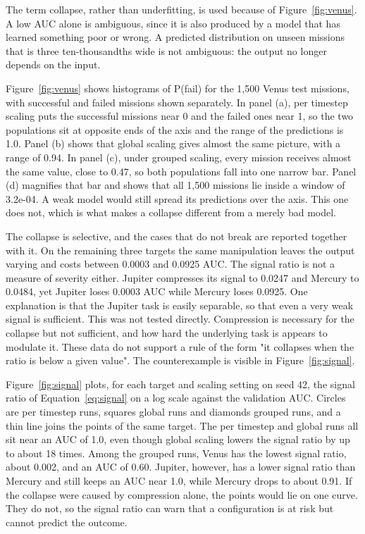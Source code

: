 The term collapse, rather than underfitting, is used because of Figure~\ref{fig:venus}. A low AUC alone is ambiguous, since it is also produced by a model that has learned something poor or wrong. A predicted distribution on unseen missions that is three ten-thousandths wide is not ambiguous: the output no longer depends on the input.


Figure~\ref{fig:venus} shows histograms of P(fail) for the 1,500 Venus test missions, with successful and failed missions shown separately. In panel (a), per timestep scaling puts the successful missions near 0 and the failed ones near 1, so the two populations sit at opposite ends of the axis and the range of the predictions is 1.0. Panel (b) shows that global scaling gives almost the same picture, with a range of 0.94. In panel (c), under grouped scaling, every mission receives almost the same value, close to 0.47, so both populations fall into one narrow bar. Panel (d) magnifies that bar and shows that all 1,500 missions lie inside a window of 3.2e-04. A weak model would still spread its predictions over the axis. This one does not, which is what makes a collapse different from a merely bad model.

The collapse is selective, and the cases that do not break are reported together with it. On the remaining three targets the same manipulation leaves the output varying and costs between 0.0003 and 0.0925 AUC. The signal ratio is not a measure of severity either. Jupiter compresses its signal to 0.0247 and Mercury to 0.0484, yet Jupiter loses 0.0003 AUC while Mercury loses 0.0925. One explanation is that the Jupiter task is easily separable, so that even a very weak signal is sufficient. This was not tested directly. Compression is necessary for the collapse but not sufficient, and how hard the underlying task is appears to modulate it. These data do not support a rule of the form "it collapses when the ratio is below a given value". The counterexample is visible in Figure~\ref{fig:signal}.


Figure~\ref{fig:signal} plots, for each target and scaling setting on seed 42, the signal ratio of Equation~\ref{eq:signal} on a log scale against the validation AUC. Circles are per timestep runs, squares global runs and diamonds grouped runs, and a thin line joins the points of the same target. The per timestep and global runs all sit near an AUC of 1.0, even though global scaling lowers the signal ratio by up to about 18 times. Among the grouped runs, Venus has the lowest signal ratio, about 0.002, and an AUC of 0.60. Jupiter, however, has a lower signal ratio than Mercury and still keeps an AUC near 1.0, while Mercury drops to about 0.91. If the collapse were caused by compression alone, the points would lie on one curve. They do not, so the signal ratio can warn that a configuration is at risk but cannot predict the outcome.

